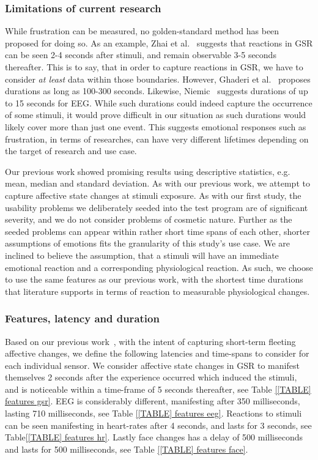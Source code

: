 \subsubsection{Limitations of current research}
While frustration can be measured, no golden-standard method has been proposed for doing so.  As an example, Zhai et
al.~\cite{gsr_len_lat3} suggests that reactions in GSR can be seen 2-4 seconds after stimuli, and remain observable 3-5
seconds thereafter. This is to say, that in order to capture reactions in GSR, we have to consider \textit{at least}
data within those boundaries. However, Ghaderi et al.~\cite{machine_learning_100s_gsr} proposes durations as long as
100-300 seconds. Likewise, Niemic~\cite{studies_of_emotion} suggests durations of up to 15 seconds for EEG. While such
durations could indeed capture the occurrence of some stimuli, it would prove difficult in our situation as such
durations would likely cover more than just one event. This suggests emotional responses such as frustration, in terms
of researches, can have very different lifetimes depending on the target of research and use case.

Our previous work\cite{first_paper} showed promising results using descriptive statistics, e.g. mean, median and standard deviation. 
As with our previous work, we attempt to capture affective state changes at stimuli exposure. 
As with our first study, the usability problems we deliberately seeded into the test program are of significant severity, and we do not consider problems of cosmetic nature.
Further as the seeded problems can appear within rather short time spans of each other, shorter assumptions of emotions fits the granularity of this study's use case. 
We are inclined to believe the assumption, that a stimuli will have an immediate emotional reaction and a corresponding physiological reaction.
As such, we choose to use the same features as our previous work, with the shortest time durations that literature supports in terms of reaction to measurable physiological changes. 

\subsubsection{Features, latency and duration}
Based on our previous work~\cite{9th_semester_project, first_paper}, with the intent of capturing short-term fleeting
affective changes, we define the following latencies and time-spans to consider for each individual sensor.  We consider
affective state changes in GSR to manifest themselves 2 seconds after the experience occurred which induced the stimuli,
and is noticeable within a time-frame of 5 seconds thereafter, see Table \ref{[TABLE] features gsr}. EEG is considerably
different, manifesting after 350 milliseconds, lasting 710 milliseconds, see Table \ref{[TABLE] features eeg}. Reactions
to stimuli can be seen manifesting in heart-rates after 4 seconds, and lasts for 3 seconds, see Table\ref{[TABLE]
  features hr}.  Lastly face changes has a delay of 500 milliseconds and lasts for 500 milliseconds, see Table
\ref{[TABLE] features face}.

